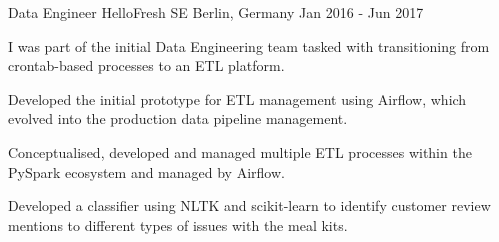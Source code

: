 \begin{cventries}
\begin{comment}
  \cventry
    {Lead NLP Engineer} %
    {Comtravo GmbH} %
    {Berlin, Germany} %
    {Aug 2017 - Apr 2022} %
	{
      \begin{cvitems} %
		\item {Joined as an NLP Engineer in August 2017, was promoted to Senior NLP Engineer in July 2019, and in June 2021 to Lead NLP Engineer.}
        \item {Led a team of 3 developers + 4 annotators, working on the system that automatically answers incoming email travel requests and assists travel agents in handling them. Coordinating development tasks based on system performance and feature requests.}
        \item {Trained, evaluated and improved different models for text classification and fine-grained NER, increasing the performance of identifying specific booking requests and performing information extraction to automatically fulfil booking requests.}
		\item {Developed algorithms to map input text into unique Knowledge Base identifiers, e.g: airports, train stations, hotels, geographic locations.}		
      \end{cvitems}
    }
\end{comment}


  \cventry
    {Data Engineer} %
    {HelloFresh SE} %
    {Berlin, Germany} %
    {Jan 2016 - Jun 2017} %
    {
      \begin{cvitems} %
        \item {I was part of the initial Data Engineering team tasked with transitioning from crontab-based processes to an ETL platform.}
        \item {Developed the initial prototype for ETL management using Airflow, which evolved into the production data pipeline management.}
		\item {Conceptualised, developed and managed multiple ETL processes within the PySpark ecosystem and managed by Airflow.}
        \item {Developed a classifier using NLTK and scikit-learn to identify customer review mentions to different types of issues with the meal kits.}
      \end{cvitems}
    }
	

\end{cventries}
